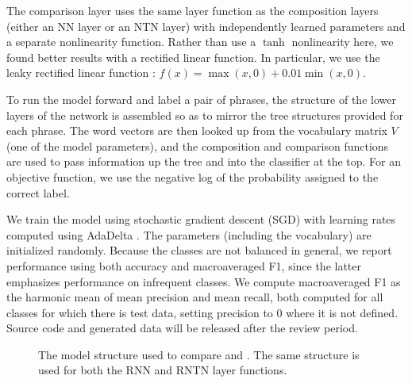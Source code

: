 The comparison layer uses the same layer function as the
composition layers (either an NN layer or an NTN layer) with
independently learned parameters and a separate nonlinearity function.
Rather than use a $\tanh$ nonlinearity here, we found better results with a rectified linear function. In
particular, we use the leaky rectified linear function
: $f(x)=\max(x, 0) +
0.01\min(x, 0)$.

To run the model forward and label a pair of phrases, the structure of
the lower layers of the network is assembled so as to mirror the tree
structures provided for each phrase. The word vectors are then looked
up from the vocabulary matrix $V$ (one of the model parameters), and
the composition and comparison functions are used to pass information
up the tree and into the classifier at the top. For an objective
function, we use the negative log of the probability assigned to the
correct label.

We train the model using stochastic gradient descent (SGD)
with learning rates computed using AdaDelta \cite{zeiler2012adadelta}.
The parameters (including the vocabulary) are initialized randomly.
Because the classes are not balanced in general, we report performance
using both accuracy and macroaveraged F1, since the latter emphasizes
 performance on infrequent classes. We compute macroaveraged F1 
as the harmonic mean of mean precision and mean recall, both computed
for all classes for which there is test data, setting precision to 0 
where it is not defined. Source code and generated data will be released
after the review period.

\begin{figure}[tp]
  \centering
  
  \caption{The model structure used to compare  and . 
    The same structure is used for both the RNN and RNTN layer functions.} 
  \label{sample-figure}
\end{figure}
